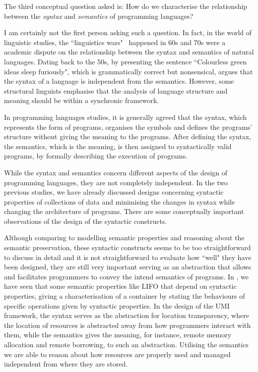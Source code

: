 \begin{center}
\vspace{-0.7em}
\vspace{-0.3em}
\end{center}

The third conceptual question asked is: 
How do we characterise the relationship between the \emph{syntax} and \emph{semantics} of programming languages?

I am certainly not the first person asking such a question. In fact, in the world of linguistic studies, the ``linguistics wars"~\citep{alma993219653502466} happened in 60s and 70s were a academic dispute on the relationship between the syntax and semantics of natural languages. Dating back to the 50s, by presenting the sentence ``Colourless green ideas sleep furiously", which is grammatically correct but nonsensical, \citet{Chomsky+1957}
argues that the syntax of a language is independent from the semantics. However, some structural linguists emphasise that the analysis of language structure and meaning should be within a synchronic framework.

In programming languages studies, it is generally agreed that the syntax, which represents the form of programs, organises the symbols and defines the programs' structure without giving the meaning to the programs. After defining the syntax, the semantics, which is the meaning, is then assigned to syntactically valid programs, by formally describing the execution of programs.

While the syntax and semantics concern different aspects of the design of programming languages, they are not completely independent. In the two previous studies, we have already discussed designs concerning syntactic properties of collections of data and minimising the changes in syntax while changing the architecture of programs. There are some conceptually important observations of the design of the syntactic constructs. 

Although comparing to modelling semantic properties and reasoning about the semantic preservation, these syntactic constructs seems to be too straightforward to discuss in detail and it is not straightforward to evaluate how ``well" they have been designed, they are still very important serving as an abstraction that allows and facilitates programmers to convey the intend semantics of programs. In \Primrose{}, we have seen that some semantic properties like LIFO that depend on syntactic properties, giving a characterisation of a container by stating the behaviours of specific operations given by syntactic properties. In the design of the UMI framework, the syntax serves as the abstraction for location transparency, where the location of resources is abstracted away from how programmers interact with them, while the semantics gives the meaning, for instance, remote memory allocation and remote borrowing, to such an abstraction. Utilising the semantics we are able to reason about how resources are properly used and managed independent from where they are stored.

